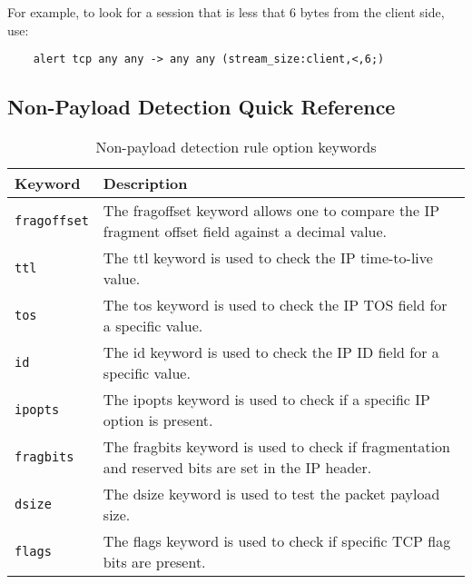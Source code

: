 \documentclass[english]{report}
\begin{document}
For example, to look for a session that is less that 6 bytes from the client
side, use:

\begin{verbatim}
    alert tcp any any -> any any (stream_size:client,<,6;)
\end{verbatim}

\subsection{Non-Payload Detection Quick Reference}
\begin{center}
\begin{longtable}[h]{| p{1in} | p{4.5in} |}
\caption{Non-payload detection rule option keywords} \\

\hline
Keyword & Description \\
\hline

\hline
\texttt{fragoffset} &

The fragoffset keyword allows one to compare the IP fragment offset field
against a decimal value. \\

\hline
\texttt{ttl} &

The ttl keyword is used to check the IP time-to-live value. \\

\hline
\texttt{tos} &

The tos keyword is used to check the IP TOS field for a specific value. \\

\hline
\texttt{id} &

The id keyword is used to check the IP ID field for a specific value. \\

\hline
\texttt{ipopts} &

The ipopts keyword is used to check if a specific IP option is present. \\

\hline
\texttt{fragbits} &

The fragbits keyword is used to check if fragmentation and reserved bits are
set in the IP header. \\

\hline
\texttt{dsize} &

The dsize keyword is used to test the packet payload size. \\

\hline
\texttt{flags} &

The flags keyword is used to check if specific TCP flag bits are present. \\


\end{longtable}
\end{center}
\end{document}
